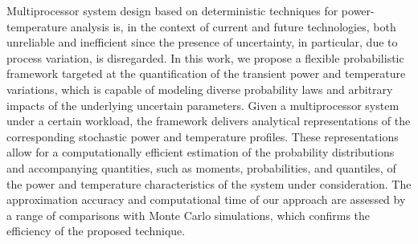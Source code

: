 Multiprocessor system design based on deterministic techniques for power-temperature analysis is, in the context of current and future technologies, both unreliable and inefficient since the presence of uncertainty, in particular, due to process variation, is disregarded.
In this work, we propose a flexible probabilistic framework targeted at the quantification of the transient power and temperature variations, which is capable of modeling diverse probability laws and arbitrary impacts of the underlying uncertain parameters.
Given a multiprocessor system under a certain workload, the framework delivers analytical representations of the corresponding stochastic power and temperature profiles.
These representations allow for a computationally efficient estimation of the probability distributions and accompanying quantities, such as moments, probabilities, and quantiles, of the power and temperature characteristics of the system under consideration.
The approximation accuracy and computational time of our approach are assessed by a range of comparisons with Monte Carlo simulations, which confirms the efficiency of the proposed technique.

